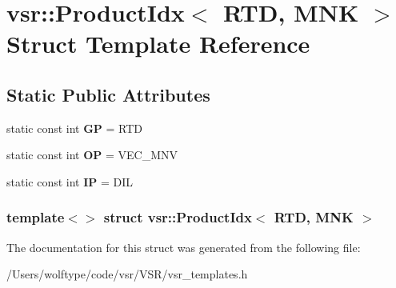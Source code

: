 \hypertarget{structvsr_1_1_product_idx_3_01_r_t_d_00_01_m_n_k_01_4}{\section{vsr\-:\-:Product\-Idx$<$ R\-T\-D, M\-N\-K $>$ Struct Template Reference}
\label{structvsr_1_1_product_idx_3_01_r_t_d_00_01_m_n_k_01_4}
}
\subsection*{Static Public Attributes}
\begin{DoxyCompactItemize}
\item 
\hypertarget{structvsr_1_1_product_idx_3_01_r_t_d_00_01_m_n_k_01_4_adf2c01b5979761de6fc85bfd4e64fc0a}{static const int {\bfseries G\-P} = R\-T\-D}\label{structvsr_1_1_product_idx_3_01_r_t_d_00_01_m_n_k_01_4_adf2c01b5979761de6fc85bfd4e64fc0a}

\item 
\hypertarget{structvsr_1_1_product_idx_3_01_r_t_d_00_01_m_n_k_01_4_a60513a0c5a71ad86c83ab39446041896}{static const int {\bfseries O\-P} = V\-E\-C\-\_\-\-M\-N\-V}\label{structvsr_1_1_product_idx_3_01_r_t_d_00_01_m_n_k_01_4_a60513a0c5a71ad86c83ab39446041896}

\item 
\hypertarget{structvsr_1_1_product_idx_3_01_r_t_d_00_01_m_n_k_01_4_abe24e7db86d4c36da2dc284d139994f9}{static const int {\bfseries I\-P} = D\-I\-L}\label{structvsr_1_1_product_idx_3_01_r_t_d_00_01_m_n_k_01_4_abe24e7db86d4c36da2dc284d139994f9}

\end{DoxyCompactItemize}
\subsubsection*{template$<$$>$ struct vsr\-::\-Product\-Idx$<$ R\-T\-D, M\-N\-K $>$}



The documentation for this struct was generated from the following file\-:\begin{DoxyCompactItemize}
\item 
/\-Users/wolftype/code/vsr/\-V\-S\-R/vsr\-\_\-templates.\-h\end{DoxyCompactItemize}

